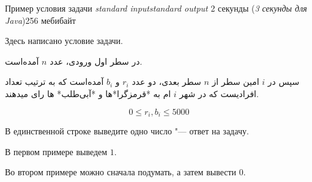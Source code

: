 \begin{problem}{Пример условия задачи}
{\textsl{standard input}}{\textsl{standard output}}
{2 секунды (\textsl{3 секунды для Java})}{256 мебибайт}{}

Здесь написано условие задачи.

\InputFile
در سطر اول ورودی، عدد $n$ آمده‌است.

سپس در $i$ امین سطر از $n$ سطر بعدی، دو عدد $r_i$ و $b_i$ آمده‌است که به ترتیب تعداد افرادیست که در شهر $i$ ام به *قرمزگرا*ها و *آبی‌طلب* ها رای میدهند.

$$0 \le r_i, b_i \le 5000$$

\OutputFile

В единственной строке выведите одно число "--- ответ на задачу.

\Examples

\begin{example}
%
%
\end{example}

\Explanations

В первом примере выведем $1$.

Во втором примере можно сначала подумать, а затем вывести $0$.

\end{problem}
